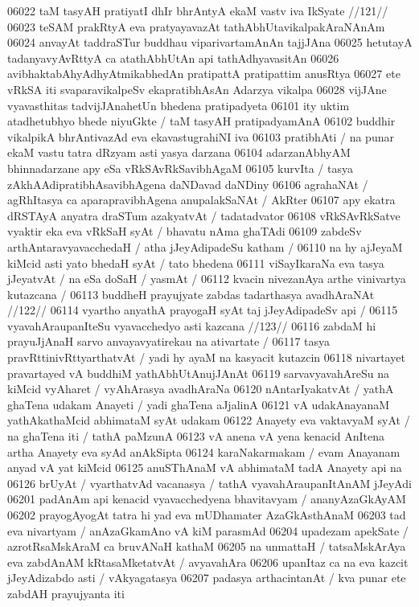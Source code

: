 06022 	taM tasyAH pratiyatI dhIr bhrAntyA ekaM vastv iva IkSyate //121//
06023 teSAM prakRtyA eva pratyayavazAt tathAbhUtavikalpakAraNAnAm 
06024 anvayAt taddraSTur buddhau viparivartamAnAn tajjJAna
06025 hetutayA tadanyavyAvRttyA ca atathAbhUtAn api tathAdhyavasitAn 
06026 avibhaktabAhyAdhyAtmikabhedAn pratipattA pratipattim anusRtya  
06027 ete vRkSA iti svaparavikalpeSv ekapratibhAsAn Adarzya vikalpa  
06028 vijJAne vyavasthitas tadvijJAnahetUn bhedena pratipadyeta
06101 ity uktim atadhetubhyo bhede niyuGkte / taM tasyAH pratipadyamAnA  
06102 buddhir vikalpikA bhrAntivazAd eva ekavastugrahiNI iva 
06103 pratibhAti / na punar ekaM vastu tatra dRzyam asti yasya darzana  
06104 adarzanAbhyAM bhinnadarzane apy eSa vRkSAvRkSavibhAgaM 
06105 kurvIta / tasya zAkhAAdipratibhAsavibhAgena daNDavad daNDiny 
06106 agrahaNAt / agRhItasya ca aparapravibhAgena anupalakSaNAt / AkRter  
06107 apy ekatra dRSTAyA anyatra draSTum azakyatvAt / tadatadvator 
06108 vRkSAvRkSatve vyaktir eka eva vRkSaH syAt / bhavatu nAma ghaTAdi  
06109 zabdeSv arthAntaravyavacchedaH / atha jJeyAdipadeSu katham / 
06110 na hy ajJeyaM kiMcid asti yato bhedaH syAt / tato bhedena 
06111 viSayIkaraNa eva tasya jJeyatvAt / na eSa doSaH / yasmAt / 
06112 	kvacin nivezanAya arthe vinivartya kutazcana / 
06113 	buddheH prayujyate zabdas tadarthasya avadhAraNAt //122//
06114 	vyartho anyathA prayogaH syAt taj jJeyAdipadeSv api / 
06115 	vyavahAraupanIteSu vyavacchedyo asti kazcana //123//  
06116 zabdaM hi prayuJjAnaH sarvo anvayavyatirekau na ativartate /
06117 tasya pravRttinivRttyarthatvAt / yadi hy ayaM na kasyacit  kutazcin 
06118 nivartayet pravartayed vA buddhiM yathAbhUtAnujJAnAt
06119 sarvavyavahAreSu na kiMcid vyAharet / vyAhArasya avadhAraNa  
06120 nAntarIyakatvAt / yathA ghaTena udakam Anayeti / yadi ghaTena aJjalinA
06121 vA udakAnayanaM yathAkathaMcid abhimataM syAt udakam 
06122 Anayety eva vaktavyaM syAt / na ghaTena iti / tathA paMzunA  
06123 vA anena vA yena kenacid AnItena artha Anayety eva syAd  anAkSipta
06124 karaNakarmakam / evam Anayanam anyad vA yat kiMcid
06125 anuSThAnaM vA abhimataM tadA Anayety api na
06126 brUyAt / vyarthatvAd vacanasya / tathA vyavahAraupanItAnAM jJeyAdi
06201 padAnAm api kenacid vyavacchedyena bhavitavyam / ananyAzaGkAyAM
06202 prayogAyogAt tatra hi yad eva mUDhamater AzaGkAsthAnaM  
06203 tad eva nivartyam / anAzaGkamAno vA kiM parasmAd 
06204 upadezam apekSate / azrotRsaMskAraM ca bruvANaH kathaM  
06205 na unmattaH / tatsaMskArAya eva zabdAnAM kRtasaMketatvAt / avyavahAra
06206 upanItaz ca na eva kazcit jJeyAdizabdo asti / vAkyagatasya
06207 padasya arthacintanAt / kva punar ete zabdAH prayujyanta iti  
